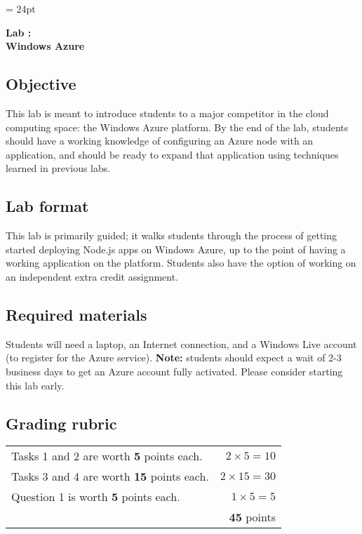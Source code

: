 \documentclass{article}
\begin{document}
\chead{\textcolor{Gray}{CSSE491 -- Scalable Computing Lab Assignment}}
\headsep = 24pt

\begin{center}
{ \large
\textbf{Lab \labnumber: \longproductname} \\
\textbf{Windows Azure}
}
\end{center}

\subsection*{Objective}
This lab is meant to introduce students to a major competitor in the cloud computing space: the Windows Azure platform. By the end of the lab, students should have a working knowledge of configuring an Azure node with an application, and should be ready to expand that application using techniques learned in previous labs.

\subsection*{Lab format}
This lab is primarily guided; it walks students through the process of getting started deploying Node.js apps on Windows Azure, up to the point of having a working application on the platform. Students also have the option of working on an independent extra credit assignment.

\subsection*{Required materials}
Students will need a laptop, an Internet connection, and a Windows Live account (to register for the Azure service). \textbf{Note:} students should expect a wait of 2-3 business days to get an Azure account fully activated. Please consider starting this lab early.

\subsection*{Grading rubric}
\begin{tabular}{p{5.5in} r}
Tasks 1 and 2 are worth \textbf{5} points each. & $2 \times 5 = 10$ \\
Tasks 3 and 4 are worth \textbf{15} points each. & $2 \times 15 = 30$ \\
Question 1 is worth \textbf{5} points each. & $1 \times 5 = 5$ \\ \hline
& \textbf{45} points
\end{tabular}
\end{document}

